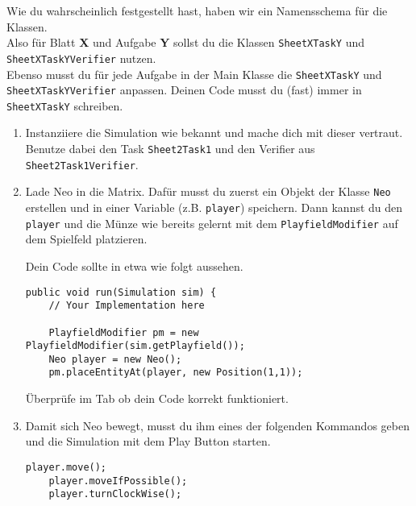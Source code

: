


\begin{Infobox}
    Wie du wahrscheinlich festgestellt hast, haben wir ein Namensschema für die Klassen.\\
    Also für Blatt \textbf{X} und Aufgabe \textbf{Y} sollst du die Klassen \lstinline{SheetXTaskY} und \lstinline{SheetXTaskYVerifier} nutzen.\\
    Ebenso musst du für jede Aufgabe in der Main Klasse die \lstinline{SheetXTaskY} und \lstinline{SheetXTaskYVerifier} anpassen.
    Deinen Code musst du (fast) immer in \lstinline{SheetXTaskY} schreiben.
\end{Infobox}

\begin{enumerate}
    \item Instanziiere die Simulation wie bekannt und mache dich mit dieser vertraut. 
        Benutze dabei den Task \lstinline{Sheet2Task1} und den Verifier aus \lstinline{Sheet2Task1Verifier}.
    \item Lade Neo in die Matrix.
        Dafür musst du zuerst ein Objekt der Klasse \lstinline{Neo} erstellen und in einer Variable (z.B. \lstinline{player}) speichern.
        Dann kannst du den \lstinline{player} und die Münze wie bereits gelernt mit dem \lstinline{PlayfieldModifier} auf dem Spielfeld platzieren.

        Dein Code sollte in etwa wie folgt aussehen.

        \begin{lstlisting}[firstnumber=14]
public void run(Simulation sim) {
    // Your Implementation here

    PlayfieldModifier pm = new PlayfieldModifier(sim.getPlayfield());
    Neo player = new Neo();
    pm.placeEntityAt(player, new Position(1,1));
        \end{lstlisting}

        Überprüfe im  Tab ob dein Code korrekt funktioniert.
    \item Damit sich Neo bewegt, musst du ihm eines der folgenden Kommandos geben und die Simulation mit dem Play Button starten.

        \begin{lstlisting}[firstnumber=20]
    player.move();
    player.moveIfPossible();
    player.turnClockWise();
        \end{lstlisting}


\end{enumerate}
